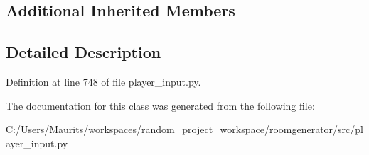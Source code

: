 \subsection*{Additional Inherited Members}


\subsection{Detailed Description}


Definition at line 748 of file player\+\_\+input.\+py.



The documentation for this class was generated from the following file\+:\begin{DoxyCompactItemize}
\item 
C\+:/\+Users/\+Maurits/workspaces/random\+\_\+project\+\_\+workspace/roomgenerator/src/player\+\_\+input.\+py\end{DoxyCompactItemize}
